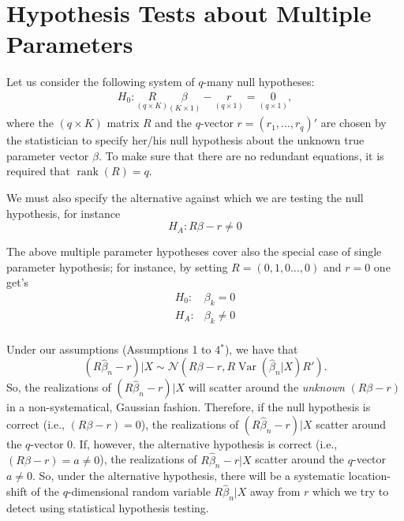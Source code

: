 \documentclass[
  14pt,
]{memoir}
\DeclareMathOperator{\rank}{rank}
\DeclareMathOperator{\V}{\operatorname{Var}}
\begin{document}
\hypertarget{ch:testmultp}{%
\section{Hypothesis Tests about Multiple Parameters}\label{ch:testmultp}}

Let us consider the following system of \(q\)-many null hypotheses:
\begin{align*}
H_0: \underset{(q\times K)}{R}\underset{(K\times 1)}{\beta} - \underset{(q\times 1)}{r} = \underset{(q\times 1)}{0},
\end{align*}
where the \((q \times K)\) matrix \(R\) and the \(q\)-vector \(r=(r_{1},\dots,r_{q})'\) are chosen by the statistician to specify her/his null hypothesis about the unknown true parameter vector \(\beta\). To make sure that there are no redundant equations, it is required that \(\rank(R)=q\).

We must also specify the alternative against which we are testing the null hypothesis, for instance
\begin{equation*}
H_A: R\beta -r \neq 0
\end{equation*}

The above multiple parameter hypotheses cover also the special case of single parameter hypothesis; for instance, by setting \(R=(0,1,0\dots,0)\) and \(r=0\) one get's
\begin{equation*}
\begin{array}{ll}
H_0:  & \beta_{k}=0 \\
H_A:  & \beta_{k} \ne 0 \\
\end{array}
\end{equation*}

Under our assumptions (Assumptions 1 to 4\(^\ast\)), we have that
\[
(R\hat\beta_n-r)|X\sim\mathcal{N}\left(R\beta -r,R\V(\hat\beta_n|X)R'\right).
\]
So, the realizations of \((R\hat\beta_n -r)|X\) will scatter around the \emph{unknown} \((R\beta -r)\) in a non-systematical, Gaussian fashion. Therefore, if the null hypothesis is correct (i.e., \((R\beta-r)=0\)), the realizations of \((R\hat\beta_n-r)|X\) scatter around the \(q\)-vector \(0\). If, however, the alternative hypothesis is correct (i.e., \((R\beta-r)=a\neq 0\)), the realizations of \(R\hat\beta_n-r|X\) scatter around the \(q\)-vector \(a\neq 0\). So, under the alternative hypothesis, there will be a systematic location-shift of the \(q\)-dimensional random variable \(R\hat\beta_n|X\) away from \(r\) which we try to detect using statistical hypothesis testing.
\end{document}
